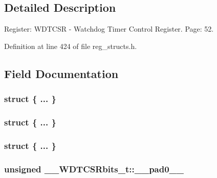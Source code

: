 \subsection{Detailed Description}
Register\+: W\+D\+T\+C\+S\+R -\/ Watchdog Timer Control Register. Page\+: 52. 

Definition at line 424 of file reg\+\_\+structs.\+h.



\subsection{Field Documentation}
\hypertarget{union_____w_d_t_c_s_rbits__t_a2d88473ec0ccf357936ca1b5dc25a2fe}{\subsubsection[{"@101}]{\setlength{\rightskip}{0pt plus 5cm}struct \{ ... \} }}\label{union_____w_d_t_c_s_rbits__t_a2d88473ec0ccf357936ca1b5dc25a2fe}
\hypertarget{union_____w_d_t_c_s_rbits__t_a96765f64d395ff911aa0cb069981fdc4}{\subsubsection[{"@103}]{\setlength{\rightskip}{0pt plus 5cm}struct \{ ... \} }}\label{union_____w_d_t_c_s_rbits__t_a96765f64d395ff911aa0cb069981fdc4}
\hypertarget{union_____w_d_t_c_s_rbits__t_a7b2b3b30f0a191f4cdee641c18420cfe}{\subsubsection[{"@105}]{\setlength{\rightskip}{0pt plus 5cm}struct \{ ... \} }}\label{union_____w_d_t_c_s_rbits__t_a7b2b3b30f0a191f4cdee641c18420cfe}
\hypertarget{union_____w_d_t_c_s_rbits__t_aadadaa08e9f975f9781fbb09618c0188}{
\subsubsection[{\+\_\+\+\_\+pad0\+\_\+\+\_\+}]{\setlength{\rightskip}{0pt plus 5cm}unsigned \+\_\+\+\_\+\+W\+D\+T\+C\+S\+Rbits\+\_\+t\+::\+\_\+\+\_\+pad0\+\_\+\+\_\+}}\label{union_____w_d_t_c_s_rbits__t_aadadaa08e9f975f9781fbb09618c0188}


